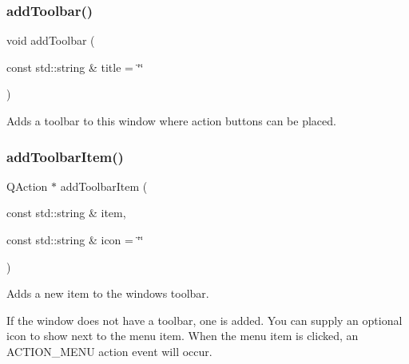 \subsubsection{\texorpdfstring{add\+Toolbar()}{addToolbar()}}
{\footnotesize\ttfamily void add\+Toolbar (\begin{DoxyParamCaption}\item[{const std\+::string \&}]{title = {\ttfamily \char`\"{}\char`\"{}} }\end{DoxyParamCaption})\hspace{0.3cm}{\ttfamily [virtual]}}



Adds a toolbar to this window where action buttons can be placed. 

\mbox{\label{classsgl_1_1GWindow_ac34ab48bd20d31312ccbf90b7120c5bb}} 
\subsubsection{\texorpdfstring{add\+Toolbar\+Item()}{addToolbarItem()}\hspace{0.1cm}{\footnotesize\ttfamily [1/4]}}
{\footnotesize\ttfamily Q\+Action $\ast$ add\+Toolbar\+Item (\begin{DoxyParamCaption}\item[{const std\+::string \&}]{item,  }\item[{const std\+::string \&}]{icon = {\ttfamily \char`\"{}\char`\"{}} }\end{DoxyParamCaption})\hspace{0.3cm}{\ttfamily [virtual]}}



Adds a new item to the window\textquotesingle{}s toolbar. 

If the window does not have a toolbar, one is added. You can supply an optional icon to show next to the menu item. When the menu item is clicked, an A\+C\+T\+I\+O\+N\+\_\+\+M\+E\+NU action event will occur. \mbox{\label{classsgl_1_1GWindow_a2fceadd3b04b459bb16e560b095eb93d}} 
